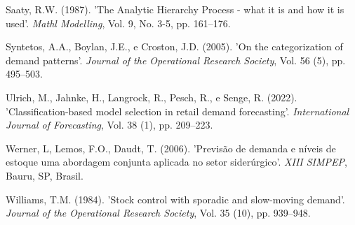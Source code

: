 \documentclass{book}
\begin{document}
\begin{thebibliography}{12}
Saaty, R.W. (1987). 'The Analytic Hierarchy Process - what it is and how it is used'. {\it Mathl Modelling}, Vol. 9, No. 3-5, pp. 161--176.

Syntetos, A.A., Boylan, J.E., e Croston, J.D. (2005). 'On the categorization of demand patterns'. {\it Journal of the Operational Research Society}, Vol. 56 (5), pp. 495--503.

Ulrich, M., Jahnke, H., Langrock, R., Pesch, R., e Senge, R. (2022). 'Classification-based model selection in retail demand forecasting'. {\it International Journal of Forecasting}, Vol. 38 (1), pp. 209--223.

Werner, L, Lemos, F.O., Daudt, T. (2006). 'Previsão de demanda e níveis de estoque uma abordagem conjunta aplicada no setor siderúrgico'. {\it XIII SIMPEP}, Bauru, SP, Brasil.

Williams, T.M. (1984). 'Stock control with sporadic and slow-moving demand'. {\it Journal of the Operational Research Society}, Vol. 35 (10), pp. 939–948. 

\end{thebibliography}
\end{document}
